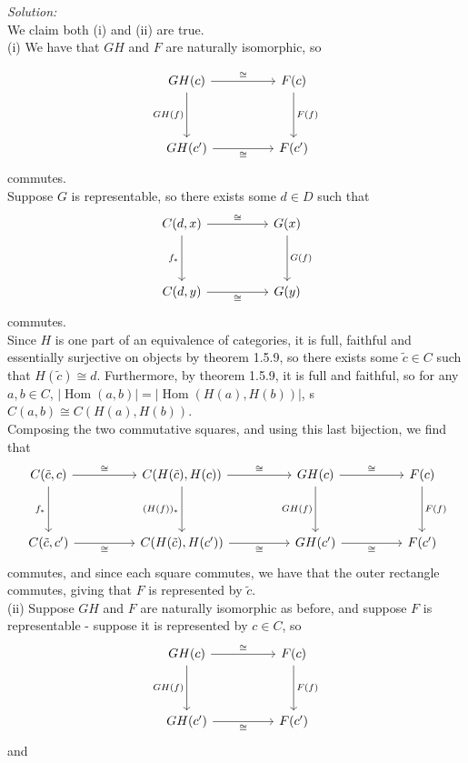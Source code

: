\documentclass[a4paper]{article}
\DeclareMathOperator{\Hom}{Hom}
\begin{document}
 \textit{Solution:}\\
 We claim both (i) and (ii) are true.\\
 \linebreak
 (i) We have that $GH$ and $F$ are naturally isomorphic, so
 
 \[\begin{tikzcd}
	{GH(c)} && {F(c)} \\
	\\
	{GH(c')} && {F(c')}
	\arrow["{GH(f)}"', from=1-1, to=3-1]
	\arrow["{F(f)}", from=1-3, to=3-3]
	\arrow["\cong", from=1-1, to=1-3]
	\arrow["\cong"', from=3-1, to=3-3]
\end{tikzcd}\]
commutes.\\
Suppose $G$ is representable, so
there exists some $d \in D$ such that
\[\begin{tikzcd}
	{C(d,x)} && {G(x)} \\
	\\
	{C(d,y)} && {G(y)}
	\arrow["{f_*}"', from=1-1, to=3-1]
	\arrow["{G(f)}", from=1-3, to=3-3]
	\arrow["\cong", from=1-1, to=1-3]
	\arrow["\cong"', from=3-1, to=3-3]
\end{tikzcd}\]
commutes.\\
Since $H$ is one part of an equivalence of categories, it is full, faithful
and essentially surjective on objects by theorem 1.5.9, so there
exists some $\tilde{c} \in C$ such that
$H(\tilde{c}) \cong d$. Furthermore, by theorem 1.5.9, it is full and
faithful, so
for any $a,b \in C$, 
$|\Hom(a,b)| = \left| \Hom(H(a),H(b)) \right| $, s
$C(a,b) \cong C(H(a), H(b))$.\\
Composing the two commutative squares, and using this last bijection, we find that
\[\begin{tikzcd}
	{C(\tilde{c},c)} && {C(H(\tilde{c}),H(c))} && {GH(c)} && {F(c)} \\
	\\
	{C(\tilde{c},c')} && {C(H(\tilde{c}),H(c'))} && {GH(c')} && {F(c')}
	\arrow["{F(f)}", from=1-7, to=3-7]
	\arrow["\cong", from=1-5, to=1-7]
	\arrow["{GH(f)}"', from=1-5, to=3-5]
	\arrow["\cong"', from=3-5, to=3-7]
	\arrow["\cong", from=1-3, to=1-5]
	\arrow["{(H(f))_*}"', from=1-3, to=3-3]
	\arrow["\cong"', from=3-3, to=3-5]
	\arrow["\cong", from=1-1, to=1-3]
	\arrow["\cong"', from=3-1, to=3-3]
	\arrow["{f_*}"', from=1-1, to=3-1]
\end{tikzcd}\]
commutes, and since each square commutes, we have that the outer rectangle
commutes, giving that $F$ is represented by $\tilde{c}$.\\
\linebreak
(ii) Suppose $GH$ and $F$ are naturally isomorphic as before, and suppose
$F$ is representable - suppose it is represented by $c \in C$, so
 \[\begin{tikzcd}
	{GH(c)} && {F(c)} \\
	\\
	{GH(c')} && {F(c')}
	\arrow["{GH(f)}"', from=1-1, to=3-1]
	\arrow["{F(f)}", from=1-3, to=3-3]
	\arrow["\cong", from=1-1, to=1-3]
	\arrow["\cong"', from=3-1, to=3-3]
\end{tikzcd}\]
and
\end{document}
